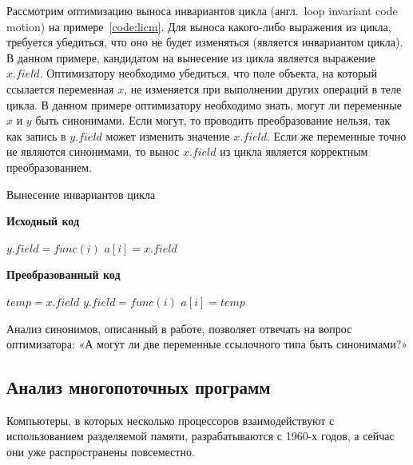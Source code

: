 \documentclass[14pt,titlepage]{extarticle}
\newcommand{\algorithmictitle}[1]{\hspace{8mm}\textbf{#1}}
\newcommand{\eng}[1]{{\English#1}}
\newcommand{\engdef}[1]{(англ.~\eng{#1})}
\begin{document}
      Рассмотрим оптимизацию выноса инвариантов цикла \engdef{loop invariant
      code motion} на примере~\ref{code:licm}.
      Для выноса какого-либо выражения из цикла, требуется убедиться, что оно
      не будет изменяться (является инвариантом цикла).
      В данном примере, кандидатом на вынесение из цикла является выражение
      $x.field$. Оптимизатору необходимо убедиться, что поле объекта, на
      который ссылается переменная $x$, не изменяется при выполнении других
      операций в теле цикла. В данном примере оптимизатору необходимо знать,
      могут ли переменные $x$ и $y$ быть синонимами. Если могут, то
      проводить преобразование нельзя, так как запись в $y.field$ может
      изменить значение $x.field$. Если же переменные точно не являются
      синонимами, то вынос $x.field$ из цикла является корректным
      преобразованием.

      \begin{algorithm}
        \caption{Вынесение инвариантов цикла}
        \label{code:licm}
        \begin{multicols}{2}
          \algorithmictitle{Исходный код}
          \begin{algorithmic}[1]
            \STATE $y.field = func(i)$
            \STATE $a[i] = x.field$
            \ENDFOR
          \end{algorithmic}
          \columnbreak
          \algorithmictitle{Преобразованный код}
          \begin{algorithmic}[1]
            \STATE $temp = x.field$
            \STATE $y.field = func(i)$
            \STATE $a[i] = temp$
            \ENDFOR
          \end{algorithmic}
        \end{multicols}
      \end{algorithm}

      Анализ синонимов, описанный в работе, позволяет отвечать на
      вопрос оптимизатора: «А могут ли две переменные ссылочного типа быть
      синонимами?»

    \subsection{Анализ многопоточных программ}
      \label{section:intro_to_multithreading}

      Компьютеры, в которых несколько процессоров взаимодействуют с
      использованием разделяемой памяти, разрабатываются с 1960-х годов, а
      сейчас они уже распространены повсеместно.
\end{document}
